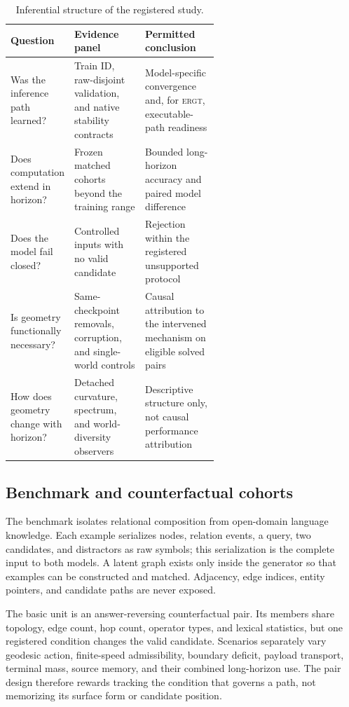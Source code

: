 \documentclass[11pt]{article}
\newcommand{\ERGT}{\textsc{ergt}}
\begin{document}
\begin{table}[t]
\centering
\caption{Inferential structure of the registered study.}
\label{tab:studylogic}
\small
\begin{tabularx}{\linewidth}{@{}P{0.25\linewidth}P{0.34\linewidth}Y@{}}
\toprule
Question & Evidence panel & Permitted conclusion \\
\midrule
Was the inference path learned?
  & Train ID, raw-disjoint validation, and native stability contracts
  & Model-specific convergence and, for \ERGT, executable-path readiness \\
Does computation extend in horizon?
  & Frozen matched cohorts beyond the training range
  & Bounded long-horizon accuracy and paired model difference \\
Does the model fail closed?
  & Controlled inputs with no valid candidate
  & Rejection within the registered unsupported protocol \\
Is geometry functionally necessary?
  & Same-checkpoint removals, corruption, and single-world controls
  & Causal attribution to the intervened mechanism on eligible solved pairs \\
How does geometry change with horizon?
  & Detached curvature, spectrum, and world-diversity observers
  & Descriptive structure only, not causal performance attribution \\
\bottomrule
\end{tabularx}
\end{table}

\subsection{Benchmark and counterfactual cohorts}

The benchmark isolates relational composition from open-domain language
knowledge. Each example serializes nodes, relation events, a query, two
candidates, and distractors as raw symbols; this serialization is the complete
input to both models. A latent graph exists only inside the generator so that
examples can be constructed and matched. Adjacency, edge indices, entity
pointers, and candidate paths are never exposed.

The basic unit is an answer-reversing counterfactual pair. Its members share
topology, edge count, hop count, operator types, and lexical statistics, but one
registered condition changes the valid candidate. Scenarios separately vary
geodesic action, finite-speed admissibility, boundary deficit, payload
transport, terminal mass, source memory, and their combined long-horizon use.
The pair design therefore rewards tracking the condition that governs a path,
not memorizing its surface form or candidate position.
\end{document}
